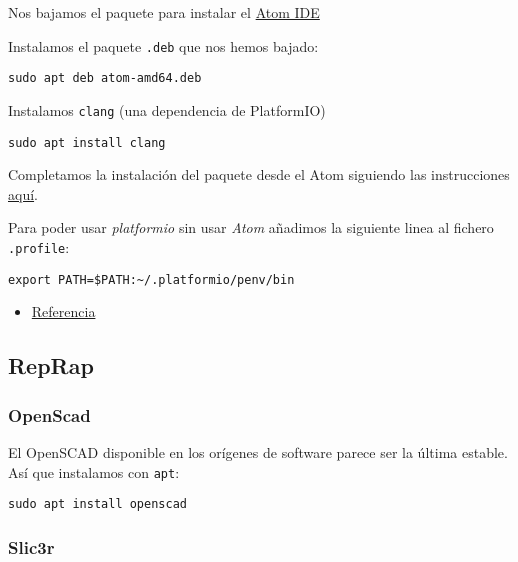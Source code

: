 \documentclass[
  12pt,
  spanish,
]{article}
\providecommand{\tightlist}{%
  \setlength{\itemsep}{0pt}\setlength{\parskip}{0pt}}
\begin{document}
Nos bajamos el paquete para instalar el \href{https://atom.io/}{Atom
IDE}

Instalamos el paquete \texttt{.deb} que nos hemos bajado:

\begin{verbatim}
sudo apt deb atom-amd64.deb
\end{verbatim}

Instalamos \texttt{clang} (una dependencia de PlatformIO)

\begin{verbatim}
sudo apt install clang
\end{verbatim}

Completamos la instalación del paquete desde el Atom siguiendo las
instrucciones
\href{https://platformio.org/get-started/ide?install=atom}{aquí}.

Para poder usar \emph{platformio} sin usar \emph{Atom} añadimos la
siguiente linea al fichero \texttt{.profile}:

\begin{verbatim}
export PATH=$PATH:~/.platformio/penv/bin
\end{verbatim}

\begin{itemize}
\tightlist
\item
  \href{https://docs.platformio.org/en/latest/installation.html\#piocore-install-shell-commands}{Referencia}
\end{itemize}

\hypertarget{reprap}{%
\subsection{RepRap}\label{reprap}}

\hypertarget{openscad}{%
\subsubsection{OpenScad}\label{openscad}}

El OpenSCAD disponible en los orígenes de software parece ser la última
estable. Así que instalamos con \texttt{apt}:

\begin{verbatim}
sudo apt install openscad
\end{verbatim}

\hypertarget{slic3r}{%
\subsubsection{Slic3r}\label{slic3r}}
\end{document}
